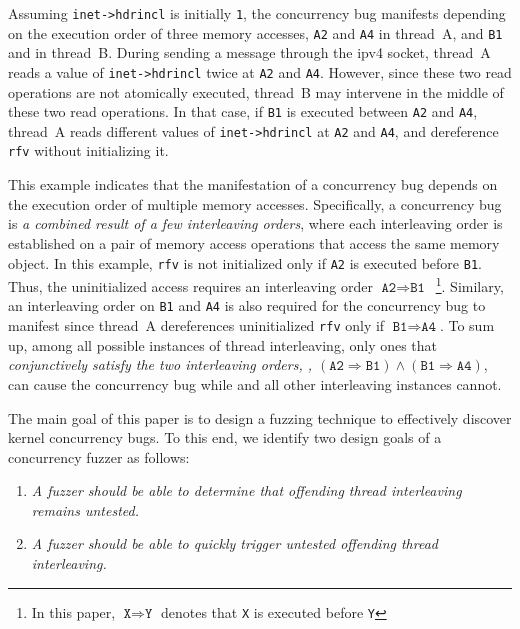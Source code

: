 Assuming \texttt{inet->hdrincl} is initially \texttt{1}, the
concurrency bug manifests depending on the execution order of three
memory accesses, \texttt{A2} and \texttt{A4} in thread~A, and
\texttt{B1} and in thread~B.
%
During sending a message through the ipv4 socket, thread~A reads a
value of \texttt{inet->hdrincl} twice at \texttt{A2} and \texttt{A4}.
%
However, since these two read operations are not atomically executed,
thread~B may intervene in the middle of these two read operations.
%
In that case, if \texttt{B1} is executed between \texttt{A2} and
\texttt{A4}, thread~A reads different values of \texttt{inet->hdrincl}
at \texttt{A2} and \texttt{A4}, and dereference \texttt{rfv} without
initializing it.


This example indicates that the manifestation of a concurrency bug
depends on the execution order of multiple memory
accesses. Specifically, a concurrency bug is \textit{a combined result
  of a few interleaving orders}, where each interleaving order is
established on a pair of memory access operations that access the same
memory object.
%
In this example, \texttt{rfv} is not initialized only if \texttt{A2}
is executed before \texttt{B1}. Thus, the uninitialized access
requires an interleaving order
$\texttt{A2} \Rightarrow \texttt{B1}$~\footnote{In this paper,
  $\texttt{X} \Rightarrow \texttt{Y}$ denotes that \texttt{X} is
  executed before \texttt{Y}}.
%
Similary, an interleaving order on \texttt{B1} and \texttt{A4} is also
required for the concurrency bug to manifest since thread~A
dereferences uninitialized \texttt{rfv} only if
$\texttt{B1} \Rightarrow \texttt{A4}$.
%
To sum up, among all possible instances of thread interleaving, only
ones that \textit{conjunctively satisfy the two interleaving orders,
  \ie,
  $(\texttt{A2} \Rightarrow \texttt{B1}) \wedge (\texttt{B1}
  \Rightarrow \texttt{A4})$}, can cause the concurrency bug while and
all other interleaving instances cannot.

%
The main goal of this paper is to design a fuzzing technique to
effectively discover kernel concurrency bugs. To this end, we identify
two design goals of a concurrency fuzzer as follows:

\vspace{0.4em}
\begin{enumerate}[label=\textbf{R\arabic*:}]
%
\item \emph{A fuzzer should be able to determine that offending thread
    interleaving remains untested.}
\item \emph{A fuzzer should be able to quickly trigger untested
    offending thread interleaving.}
%
\end{enumerate}

